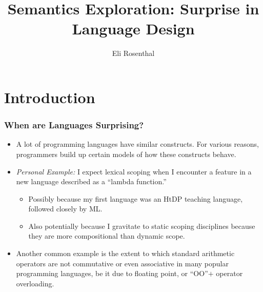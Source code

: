 \documentclass{beamer}
\title{Semantics Exploration: Surprise in Language Design}
\author{Eli Rosenthal}
\begin{document}
{%
  \frame{\titlepage}
}

\tableofcontents

\section{Introduction}
\begin{frame}
  \frametitle{When are Languages Surprising?}
  
  \begin{itemize}
  \item A lot of programming languages have similar constructs. For various
    reasons, programmers build up certain models of how these constructs behave.
    \pause
  \item \emph{Personal Example:} I expect lexical scoping when I encounter a feature in a
    new language described as a ``lambda function.''
    \begin{itemize}
    \item Possibly because my first language was an HtDP teaching language,
      followed closely by ML.
    \item Also potentially because I gravitate to static scoping disciplines because
      they are more compositional than dynamic scope.
    \end{itemize}
    \pause
  \item Another common example is the extent to which standard arithmetic
    operators are not commutative or even associative in many popular
    programming languages, be it due to floating point, or ``OO''$+$ operator overloading.

\end{itemize}

\end{frame}
\end{document}
